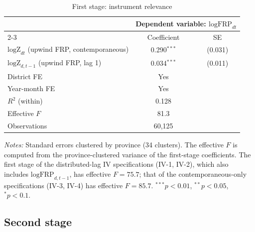 \documentclass[12pt]{article}
\begin{document}
\begin{table}[H]
\centering
\caption{First stage: instrument relevance}
\label{tab:firststage}
\begin{tabular}{lcc}
\toprule
 & \multicolumn{2}{c}{Dependent variable: $\text{logFRP}_{dt}$} \\
\cmidrule(lr){2-3}
 & Coefficient & SE \\
\midrule
$\text{logZ}_{dt}$ (upwind FRP, contemporaneous) & 0.290$^{***}$ & (0.031) \\
$\text{logZ}_{d,t-1}$ (upwind FRP, lag 1)        & 0.034$^{***}$ & (0.011) \\
\midrule
District FE       & Yes \\
Year-month FE     & Yes \\
$R^2$ (within)     & 0.128 \\
Effective $F$ \citep{montielolea2013} & 81.3 \\
Observations       & 60{,}125 \\
\bottomrule
\end{tabular}
\begin{minipage}{0.85\textwidth}
\vspace{4pt}
\footnotesize \emph{Notes:} Standard errors clustered by province (34 clusters). The effective $F$ is computed from the province-clustered variance of the first-stage coefficients. The first stage of the distributed-lag IV specifications (IV-1, IV-2), which also includes $\text{logFRP}_{d,t-1}$, has effective $F=75.7$; that of the contemporaneous-only specifications (IV-3, IV-4) has effective $F=85.7$. $^{***}p<0.01$, $^{**}p<0.05$, $^{*}p<0.1$.
\end{minipage}
\end{table}

\subsection{Second stage}
\end{document}
